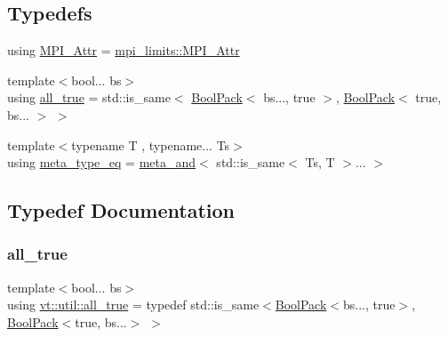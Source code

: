 \subsection*{Typedefs}
\begin{DoxyCompactItemize}
\item 
using \hyperlink{namespacevt_1_1util_acdef825f3bbbffb020925d3ba6151df9}{M\+P\+I\+\_\+\+Attr} = \hyperlink{structvt_1_1util_1_1mpi__limits_1_1_m_p_i___attr}{mpi\+\_\+limits\+::\+M\+P\+I\+\_\+\+Attr}
\item 
{\footnotesize template$<$bool... bs$>$ }\\using \hyperlink{namespacevt_1_1util_a3169b1fa334a1e8fa2326b8db648e446}{all\+\_\+true} = std\+::is\+\_\+same$<$ \hyperlink{structvt_1_1util_1_1_bool_pack}{Bool\+Pack}$<$ bs..., true $>$, \hyperlink{structvt_1_1util_1_1_bool_pack}{Bool\+Pack}$<$ true, bs... $>$ $>$
\item 
{\footnotesize template$<$typename T , typename... Ts$>$ }\\using \hyperlink{namespacevt_1_1util_aaa76da2983f12be56a31a96c017e8dd1}{meta\+\_\+type\+\_\+eq} = \hyperlink{structvt_1_1util_1_1meta__and}{meta\+\_\+and}$<$ std\+::is\+\_\+same$<$ Ts, T $>$... $>$
\end{DoxyCompactItemize}


\subsection{Typedef Documentation}
\mbox{\label{namespacevt_1_1util_a3169b1fa334a1e8fa2326b8db648e446}} 
\subsubsection{\texorpdfstring{all\+\_\+true}{all\_true}}
{\footnotesize\ttfamily template$<$bool... bs$>$ \\
using \hyperlink{namespacevt_1_1util_a3169b1fa334a1e8fa2326b8db648e446}{vt\+::util\+::all\+\_\+true} = typedef std\+::is\+\_\+same$<$\hyperlink{structvt_1_1util_1_1_bool_pack}{Bool\+Pack}$<$bs..., true$>$, \hyperlink{structvt_1_1util_1_1_bool_pack}{Bool\+Pack}$<$true, bs...$>$ $>$}

\mbox{\label{namespacevt_1_1util_aaa76da2983f12be56a31a96c017e8dd1}} 
